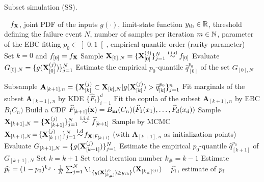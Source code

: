 \begin{algorithm}[h]
    \caption{Subset simulation (SS).}\label{alg:ss}
    \footnotesize
    \begin{algorithmic}
        \State {}\hfill~
        \State $f_{\bf X}$, joint PDF of the inputs
        \State $g(\cdot)$, limit-state function
        \State $y_\mathrm{th} \in \mathbb{R}$, threshold defining the failure event 
        \State $N$, number of samples per iteration
        \State $m \in \mathbb{N}$, parameter of the EBC fitting
        \State $p_0 \in \left]0, 1\right[$, empirical quantile order (rarity parameter)
        \State {}\hfill~
        \State Set $k = 0$ and $f_{[0]} = f_{\bf X}$
        \State Sample ${\bf X}_{[0], N} = \{{\bf X}_{[0]}^{(j)}\}_{j=1}^N \overset{\text{i.i.d}}{\sim} f_{[0]}$
        \State Evaluate $G_{[0], N} = \{g({\bf X}_{[0]}^{(j)})\}_{j=1}^N$
        \State Estimate the empirical $p_0$-quantile $\widehat{q}_{[0]}^{p_0}$ of the set $G_{[0], N}$
        
        \State Subsample $\mathbf{A}_{[k+1], n}=\{{\bf X}_{[k]}^{(j)} \subset {\bf X}_{[k], N}| g({\bf X}_{[k]}^{(j)}) > \widehat{q}_{[k]}^{p_0} \}_{j=1}^n$
        \State Fit marginals of the subset $\mathbf{A}_{[k+1], n}$ by KDE $\{\widehat{F}_i\}_{i=1}^d$
        \State Fit the copula of the subset $\mathbf{A}_{[k+1], n}$ by EBC $B_\bm(C_n)$
        \State Build a CDF $\widehat{F}_{[k+1]}({\bf x}) = B_{\bf m}(C_n)(\widehat{F}_1(x_1), \dots, \widehat{F}_d(x_d))$
        \State Sample ${\bf X}_{[k+1], N} = \{{\bf X}_{[k+1]}^{(j)}\}_{j=1}^N \overset{\text{i.i.d}}{\sim} \widehat{f}_{[k+1]}$
        \State Sample by MCMC ${\bf X}_{[k+1], N} \!=\! \{{\bf X}_{[k+1]}^{(j)}\}_{j=1}^N \!\overset{\text{i.d}}{\sim}\! f_{{\bf X} | F_{[k+1]}}$ (with $\mathbf{A}_{[k+1], n}$ as initialization points)
        \State Evaluate $G_{[k+1], N} = \{g({\bf X}_{[k+1]}^{(j)})\}_{j=1}^N$
        \State Estimate the empirical $p_0$-quantile $\widehat{q}_{[k+1]}^{p_0}$ of $G_{[k+1], N}$
        \State Set $k = k+1$
        \EndWhile
        \State Set total iteration number $k_\# = k-1$ 
        \State Estimate $\widehat{\pf} = (1 - p_0)^{k_\#} \cdot \frac{1}{N} \sum_{j=1}^N \1_{\{g(\bX_{[k_\#]}^{(j)}) \geq \yth  \}}(\bX_{[k_\#]^{(j)}}) $
        \State {}\hfill~
        \State $\widehat{p_\mathrm{f}}$, estimate of $p_\mathrm{f}$
    \end{algorithmic}
    \end{algorithm}












